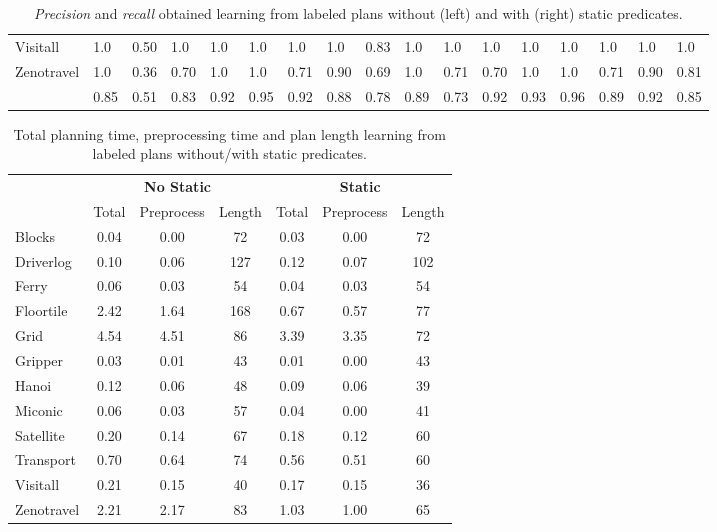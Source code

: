 \documentclass[letterpaper]{article} %
\begin{document}
\begin{table*}
{\begin{tabular}{l|l|l|l|l|l|l||l|l||l|l|l|l|l|l||l|l|}
			Visitall & 1.0 & 0.50 & 1.0 & 1.0 & 1.0 & 1.0 & 1.0 & 0.83 & 1.0 & 1.0 & 1.0 & 1.0 & 1.0 & 1.0 & 1.0 & 1.0\\
			Zenotravel & 1.0 & 0.36 & 0.70 & 1.0 & 1.0 & 0.71 & 0.90 & 0.69 &1.0 & 0.71 & 0.70 & 1.0 & 1.0 & 0.71 & 0.90 & 0.81\\
			\hline
			\bf  & 0.85 & 0.51 & 0.83 & 0.92 & 0.95 & 0.92 & 0.88 & 0.78 & 0.89 & 0.73 & 0.92 & 0.93 & 0.96 & 0.89 & 0.92 & 0.85\\
		\end{tabular}
	}
\caption{\small {\em Precision} and {\em recall} obtained learning from labeled plans without (left) and with (right) static predicates.}
\label{tab:results_plans}
\end{table*}


\begin{table}
\begin{scriptsize}
	\begin{center}
		\begin{tabular}{l|c|c|c||c|c|c|}
                         & \multicolumn{3}{|c||}{\bf No Static}& \multicolumn{3}{|c|}{\bf Static}\\
			 & Total & Preprocess & Length  & Total & Preprocess &  Length\\
			\hline
			Blocks & 0.04 & 0.00 & 72  & 0.03 & 0.00 & 72 \\
			Driverlog & 0.10 & 0.06 & 127 & 0.12 & 0.07 & 102 \\
			Ferry & 0.06 & 0.03 & 54 & 0.04 & 0.03 & 54 \\
			Floortile & 2.42 & 1.64 & 168 & 0.67 & 0.57 & 77 \\
			Grid & 4.54 & 4.51 & 86 & 3.39 & 3.35 & 72 \\ 
			Gripper & 0.03 & 0.01 & 43 & 0.01 & 0.00 & 43 \\
                        Hanoi & 0.12 & 0.06 & 48 & 0.09 & 0.06 & 39 \\
                        Miconic & 0.06 & 0.03 & 57 & 0.04 & 0.00 & 41 \\
			Satellite & 0.20 & 0.14 & 67 & 0.18 & 0.12 & 60 \\
			Transport & 0.70 & 0.64 & 74 & 0.56 & 0.51 & 60 \\
			Visitall & 0.21 & 0.15 & 40 & 0.17 & 0.15 & 36 \\
			Zenotravel & 2.21 & 2.17 & 83 & 1.03 & 1.00 & 65 \\			
		\end{tabular}
	\end{center}
        \end{scriptsize}
	\caption{\small Total planning time, preprocessing time and plan length learning from labeled plans without/with static predicates.}
	\label{tab:time_plans}	
\end{table}
\end{document}
